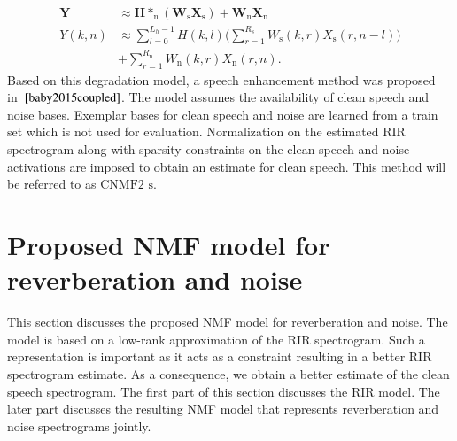 \begin{align}
\mathbf{Y}&\approx \mathbf{H} *_{\text{n}} (\mathbf{W}_{\text{s}}\mathbf{X}_{\text{s}}) + \mathbf{W}_{\text{n}}\mathbf{X}_{\text{n}}\nonumber\\
Y(k,n)&\approx\sum_{l=0}^{L_h-1}H(k,l)\bigg(\sum_{r=1}^{R_{\text{s}}} W_{\text{s}}(k,r)X_{\text{s}}(r,n-l)\bigg) \nonumber\\
      &+ \sum_{r=1}^{R_{\text{n}}}W_{\text{n}}(k,r)X_{\text{n}}(r,n).
\label{eq:deg_model2}
\end{align}
Based on this degradation model, a speech enhancement method was proposed in~$\cite{baby2015coupled}$. The model assumes the availability of clean speech and noise bases. Exemplar bases for clean speech and noise are learned from a train set which is not used for evaluation. Normalization on the estimated RIR spectrogram along with sparsity constraints on the clean speech and noise activations are imposed to obtain an estimate for clean speech. This method will be referred to as $\text{CNMF2\_s}$.

\section{Proposed NMF model for reverberation and noise}
\label{sec:ProposedModel}
This section discusses the proposed NMF model for reverberation and noise. The model is based on a low-rank approximation of the RIR spectrogram. Such a representation is important as it acts as a constraint resulting in a better RIR spectrogram estimate. As a consequence, we obtain a better estimate of the clean speech spectrogram. The first part of this section discusses the RIR model. The later part discusses the resulting NMF model that represents reverberation and noise spectrograms jointly.

